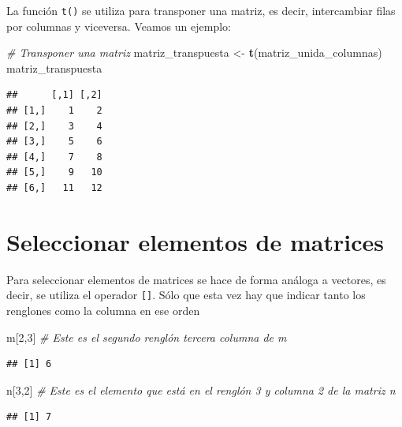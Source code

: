 \documentclass[
]{book}
\newenvironment{Shaded}{\begin{snugshade}}{\end{snugshade}}
\newcommand{\CommentTok}[1]{\textcolor[rgb]{0.56,0.35,0.01}{\textit{#1}}}
\newcommand{\DecValTok}[1]{\textcolor[rgb]{0.00,0.00,0.81}{#1}}
\newcommand{\FunctionTok}[1]{\textcolor[rgb]{0.13,0.29,0.53}{\textbf{#1}}}
\newcommand{\NormalTok}[1]{#1}
\newcommand{\OtherTok}[1]{\textcolor[rgb]{0.56,0.35,0.01}{#1}}
\begin{document}
La función \texttt{t()} se utiliza para transponer una matriz, es decir, intercambiar filas por columnas y viceversa. Veamos un ejemplo:

\begin{Shaded}
\begin{Highlighting}[]
\CommentTok{\# Transponer una matriz}
\NormalTok{matriz\_transpuesta }\OtherTok{\textless{}{-}} \FunctionTok{t}\NormalTok{(matriz\_unida\_columnas)}
\NormalTok{matriz\_transpuesta}
\end{Highlighting}
\end{Shaded}

\begin{verbatim}
##      [,1] [,2]
## [1,]    1    2
## [2,]    3    4
## [3,]    5    6
## [4,]    7    8
## [5,]    9   10
## [6,]   11   12
\end{verbatim}

\hypertarget{seleccionar-elementos-de-matrices}{%
\section{Seleccionar elementos de matrices}\label{seleccionar-elementos-de-matrices}}

Para seleccionar elementos de matrices se hace de forma análoga a vectores, es decir, se utiliza el operador \texttt{{[}{]}}. Sólo que esta vez hay que indicar tanto los renglones como la columna en ese orden

\begin{Shaded}
\begin{Highlighting}[]
\NormalTok{m[}\DecValTok{2}\NormalTok{,}\DecValTok{3}\NormalTok{]  }\CommentTok{\# Este es el segundo renglón tercera columna de m}
\end{Highlighting}
\end{Shaded}

\begin{verbatim}
## [1] 6
\end{verbatim}

\begin{Shaded}
\begin{Highlighting}[]
\NormalTok{n[}\DecValTok{3}\NormalTok{,}\DecValTok{2}\NormalTok{]  }\CommentTok{\# Este es el elemento que está en el renglón 3 y columna 2 de la matriz n }
\end{Highlighting}
\end{Shaded}

\begin{verbatim}
## [1] 7
\end{verbatim}
\end{document}
